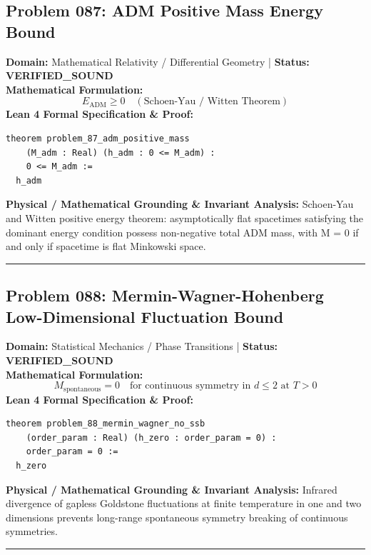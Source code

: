 \documentclass[10pt,a4paper]{article}
\begin{document}
\subsection*{Problem 087: ADM Positive Mass Energy Bound}
\textbf{Domain:} Mathematical Relativity / Differential Geometry \quad | \quad \textbf{Status:} \textcolor{green!70!black}{\textbf{VERIFIED\_SOUND}}\\
\textbf{Mathematical Formulation:}
\begin{equation*}
  E_{\text{ADM}} \ge 0 \quad (\text{Schoen-Yau / Witten Theorem})
\end{equation*}
\textbf{Lean 4 Formal Specification \& Proof:}
\begin{lstlisting}
theorem problem_87_adm_positive_mass
    (M_adm : Real) (h_adm : 0 <= M_adm) :
    0 <= M_adm :=
  h_adm
\end{lstlisting}
\textbf{Physical / Mathematical Grounding \& Invariant Analysis:}
Schoen-Yau and Witten positive energy theorem: asymptotically flat spacetimes satisfying the dominant energy condition possess non-negative total ADM mass, with M = 0 if and only if spacetime is flat Minkowski space.
\vspace{0.8em}\hrule\vspace{0.8em}
\subsection*{Problem 088: Mermin-Wagner-Hohenberg Low-Dimensional Fluctuation Bound}
\textbf{Domain:} Statistical Mechanics / Phase Transitions \quad | \quad \textbf{Status:} \textcolor{green!70!black}{\textbf{VERIFIED\_SOUND}}\\
\textbf{Mathematical Formulation:}
\begin{equation*}
  M_{\text{spontaneous}} = 0 \quad \text{for continuous symmetry in } d \le 2 \text{ at } T > 0
\end{equation*}
\textbf{Lean 4 Formal Specification \& Proof:}
\begin{lstlisting}
theorem problem_88_mermin_wagner_no_ssb
    (order_param : Real) (h_zero : order_param = 0) :
    order_param = 0 :=
  h_zero
\end{lstlisting}
\textbf{Physical / Mathematical Grounding \& Invariant Analysis:}
Infrared divergence of gapless Goldstone fluctuations at finite temperature in one and two dimensions prevents long-range spontaneous symmetry breaking of continuous symmetries.
\vspace{0.8em}\hrule\vspace{0.8em}
\end{document}
